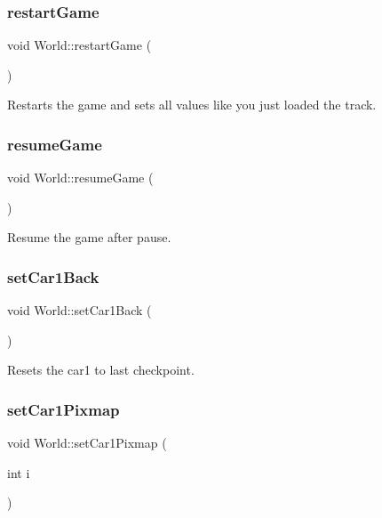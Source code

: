 \subsubsection{\texorpdfstring{restartGame}{restartGame}}
{\footnotesize\ttfamily void World\+::restart\+Game (\begin{DoxyParamCaption}{ }\end{DoxyParamCaption})\hspace{0.3cm}{\ttfamily [slot]}}



Restarts the game and sets all values like you just loaded the track. 

\mbox{\label{class_world_a1b140a6e52459ad1ea23b21d057d1b39}} 
\subsubsection{\texorpdfstring{resumeGame}{resumeGame}}
{\footnotesize\ttfamily void World\+::resume\+Game (\begin{DoxyParamCaption}{ }\end{DoxyParamCaption})\hspace{0.3cm}{\ttfamily [slot]}}



Resume the game after pause. 

\mbox{\label{class_world_a0b39f9fe5ef2682beb634bd4581593e4}} 
\subsubsection{\texorpdfstring{setCar1Back}{setCar1Back}}
{\footnotesize\ttfamily void World\+::set\+Car1\+Back (\begin{DoxyParamCaption}{ }\end{DoxyParamCaption})\hspace{0.3cm}{\ttfamily [signal]}}



Resets the car1 to last checkpoint. 

\mbox{\label{class_world_a4177c9d6ebf5382d7645d839d860b32a}} 
\subsubsection{\texorpdfstring{setCar1Pixmap}{setCar1Pixmap}}
{\footnotesize\ttfamily void World\+::set\+Car1\+Pixmap (\begin{DoxyParamCaption}\item[{int}]{i }\end{DoxyParamCaption})\hspace{0.3cm}{\ttfamily [signal]}}

